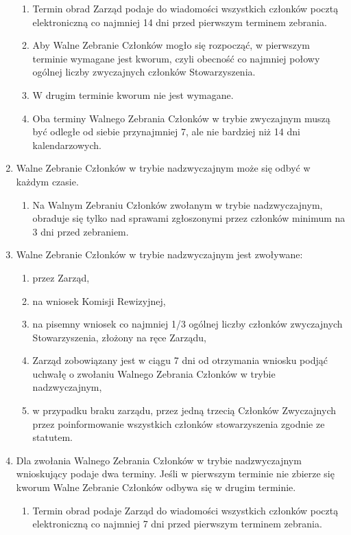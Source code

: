 \documentclass{article}
\begin{document}
\begin{enumerate}
      \begin{enumerate}
        \item Termin obrad Zarząd podaje do wiadomości wszystkich członków pocztą elektroniczną co najmniej 14 dni przed pierwszym terminem zebrania.
        \item Aby Walne Zebranie Członków mogło się rozpocząć, w pierwszym terminie wymagane jest kworum, czyli obecność co najmniej połowy ogólnej liczby zwyczajnych członków Stowarzyszenia.
        \item W drugim terminie kworum nie jest wymagane.
        \item Oba terminy Walnego Zebrania Członków w trybie zwyczajnym muszą być odległe od siebie przynajmniej 7, ale nie bardziej niż 14 dni kalendarzowych.
      \end{enumerate}
    \item Walne Zebranie Członków w trybie nadzwyczajnym może się odbyć w każdym czasie.
      \begin{enumerate}
        \item Na Walnym Zebraniu Członków zwołanym w trybie nadzwyczajnym, obraduje się tylko nad sprawami zgłoszonymi przez członków minimum na 3 dni przed zebraniem.
      \end{enumerate}
    \item Walne Zebranie Członków w trybie nadzwyczajnym jest zwoływane:
      \begin{enumerate}
        \item przez Zarząd,
        \item na wniosek Komisji Rewizyjnej,
        \item na pisemny wniosek co najmniej 1/3 ogólnej liczby członków zwyczajnych Stowarzyszenia, złożony na ręce Zarządu,
        \item Zarząd zobowiązany jest w ciągu 7 dni od otrzymania wniosku podjąć uchwałę o zwołaniu Walnego Zebrania Członków w trybie nadzwyczajnym,
        \item w przypadku braku zarządu, przez jedną trzecią Członków Zwyczajnych przez poinformowanie wszystkich członków stowarzyszenia zgodnie ze statutem.
        \end{enumerate}
    \item Dla zwołania Walnego Zebrania Członków w trybie nadzwyczajnym wnioskujący podaje dwa terminy. Jeśli w pierwszym terminie nie zbierze się kworum Walne Zebranie Członków odbywa się w drugim terminie.
      \begin{enumerate}
        \item Termin obrad podaje Zarząd do wiadomości wszystkich członków pocztą elektroniczną co najmniej 7 dni przed pierwszym terminem zebrania.

\end{enumerate}
\end{enumerate}
\end{document}
